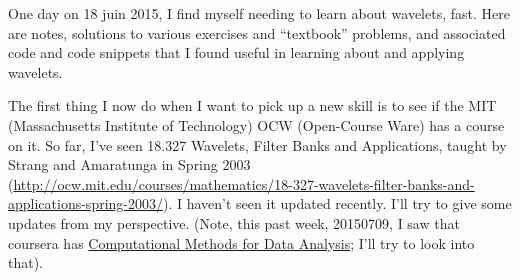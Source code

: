 \documentclass[twoside]{amsart}
\theoremstyle{plain}
\theoremstyle{definition}
\theoremstyle{remark}
\numberwithin{equation}{section}
\begin{document}
\maketitle

One day on 18 juin 2015, I find myself needing to learn about wavelets, fast.  Here are notes, solutions to various exercises and ``textbook'' problems, and associated code and code snippets that I found useful in learning about and applying wavelets.  

The first thing I now do when I want to pick up a new skill is to see if the MIT (Massachusetts Institute of Technology) OCW (Open-Course Ware) has a course on it.  So far, I've seen 18.327 Wavelets, Filter Banks and Applications, taught by Strang and Amaratunga in Spring 2003 \cite{GStrangKAmaratunga2003} (\url{http://ocw.mit.edu/courses/mathematics/18-327-wavelets-filter-banks-and-applications-spring-2003/}).  I haven't seen it updated recently.  I'll try to give some updates from my perspective. (Note, this past week, 20150709, I saw that coursera has \href{https://www.coursera.org/course/compmethods}{Computational Methods for Data Analysis}; I'll try to look into that).  
\end{document}
